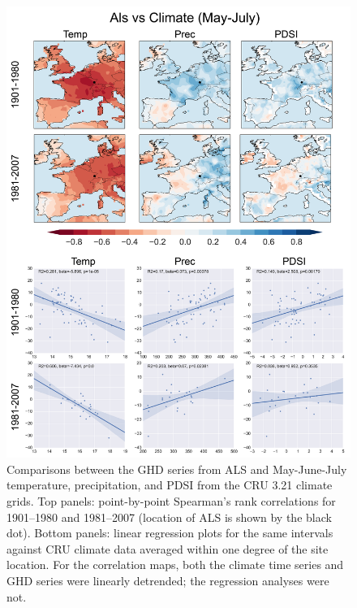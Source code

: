 \documentclass[12pt]{article}
\begin{document}
\begin{figure}
\center
\includegraphics[width=.9\columnwidth,scale=2]{SUPP_fig_04_Als_MJJ_climate_onedeg.png}
\caption{Comparisons between the GHD series from ALS and May-June-July temperature, precipitation, and PDSI from the CRU 3.21 climate grids. Top panels: point-by-point Spearman's rank correlations for 1901--1980 and 1981--2007 (location of ALS is shown by the black dot). Bottom panels: linear regression plots for the same intervals against CRU climate data averaged within one degree of the site location. For the correlation maps, both the climate time series and GHD series were linearly detrended; the regression analyses were not.}
\end{figure}
\end{document}

